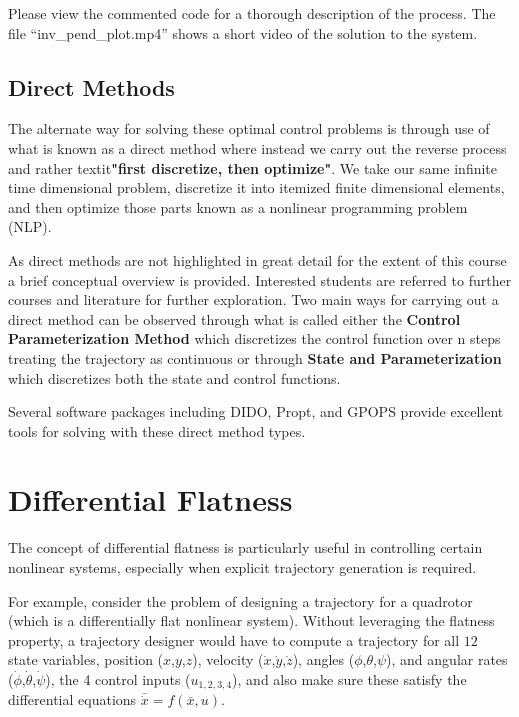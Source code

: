 \documentclass[twoside]{article}
\begin{document}
Please view the commented code for a thorough description of the process. The file ``inv\_pend\_plot.mp4'' shows a short video of the solution to the system.



\subsection{Direct Methods}
The alternate way for solving these optimal control problems is through use of what is known as a direct method where instead we carry out the reverse process and rather textit{\textbf{"first discretize, then optimize"}}. We take our same infinite time dimensional problem, discretize it into itemized finite dimensional elements, and then optimize those parts known as a nonlinear programming problem (NLP).

As direct methods are not highlighted in great detail for the extent of this course a brief conceptual overview is provided. Interested students are referred to further courses and literature for further exploration. Two main ways for carrying out a direct method can be observed through what is called either the \textbf{Control Parameterization Method} which discretizes the control function over n steps treating the trajectory as continuous or through \textbf{State and Parameterization} which discretizes both the state and control functions.

Several software packages including DIDO, Propt, and GPOPS provide excellent tools for solving with these direct method types.

\section{Differential Flatness}
The concept of differential flatness is particularly useful in controlling certain nonlinear systems, especially when explicit trajectory generation is required.

For example, consider the problem of designing a trajectory for a quadrotor (which is a differentially flat nonlinear system). Without leveraging the flatness property, a trajectory designer would have to compute a trajectory for all $12$ state variables, position ($x$,$y$,$z$), velocity ($\dot{x}$,$\dot{y}$,$\dot{z}$), angles ($\phi$,$\theta$,$\psi$), and angular rates ($\dot{\phi}$,$\dot{\theta}$,$\dot{\psi}$), the 4 control inputs ($u_{1,2,3,4}$), and also make sure these satisfy the differential equations $\bar{\dot{x}} = f(\bar{x},u)$.
\end{document}
